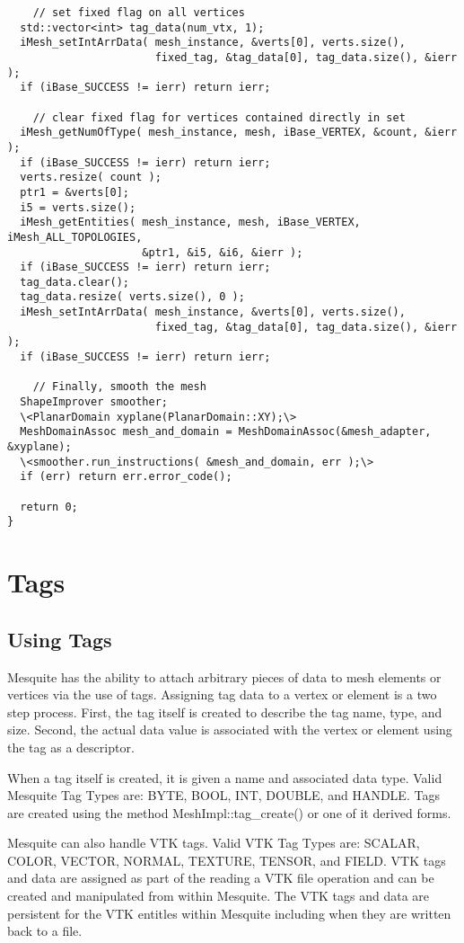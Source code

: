\begin{lstlisting}
    // set fixed flag on all vertices
  std::vector<int> tag_data(num_vtx, 1);
  iMesh_setIntArrData( mesh_instance, &verts[0], verts.size(), 
                       fixed_tag, &tag_data[0], tag_data.size(), &ierr );
  if (iBase_SUCCESS != ierr) return ierr;

    // clear fixed flag for vertices contained directly in set
  iMesh_getNumOfType( mesh_instance, mesh, iBase_VERTEX, &count, &ierr );
  if (iBase_SUCCESS != ierr) return ierr;
  verts.resize( count );
  ptr1 = &verts[0];
  i5 = verts.size();
  iMesh_getEntities( mesh_instance, mesh, iBase_VERTEX, iMesh_ALL_TOPOLOGIES,
                     &ptr1, &i5, &i6, &ierr );
  if (iBase_SUCCESS != ierr) return ierr;
  tag_data.clear();
  tag_data.resize( verts.size(), 0 );
  iMesh_setIntArrData( mesh_instance, &verts[0], verts.size(), 
                       fixed_tag, &tag_data[0], tag_data.size(), &ierr );
  if (iBase_SUCCESS != ierr) return ierr;

    // Finally, smooth the mesh
  ShapeImprover smoother;
  \<PlanarDomain xyplane(PlanarDomain::XY);\>
  MeshDomainAssoc mesh_and_domain = MeshDomainAssoc(&mesh_adapter, &xyplane);
  \<smoother.run_instructions( &mesh_and_domain, err );\>
  if (err) return err.error_code();

  return 0;
}
\end{lstlisting}

\section{Tags} \label{sec:tags_section}

\subsection{Using Tags}

Mesquite has the ability to attach arbitrary pieces of data to mesh elements or vertices via the use of tags.  Assigning tag data to a vertex or element is a two step process.  First, the tag itself is created to describe the tag name, type, and size.  Second, the actual data value is associated with the vertex or element using the tag as a descriptor.

When a tag itself is created, it is given a name and associated data type.  Valid Mesquite Tag Types are: BYTE, BOOL, INT, DOUBLE, and HANDLE. Tags are created using the method MeshImpl::tag\_create() or one of it derived forms.

Mesquite can also handle VTK tags.  Valid VTK Tag Types are: SCALAR, COLOR, VECTOR, NORMAL, TEXTURE, TENSOR, and FIELD. VTK tags and data are assigned as part of the reading a VTK file operation and can be created and manipulated from within Mesquite.  The VTK tags and data are persistent for the VTK entitles within Mesquite including when they are written back to a file.

